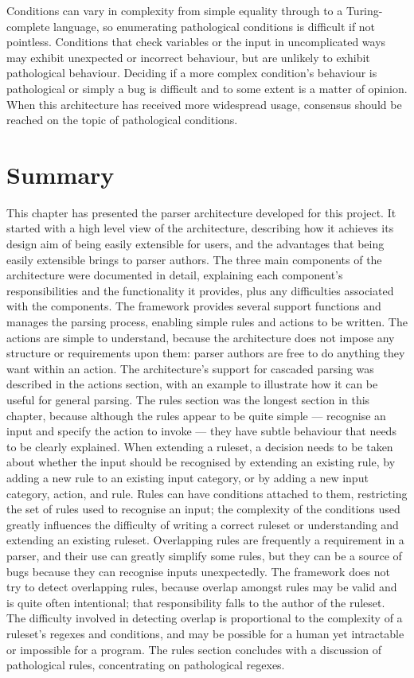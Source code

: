 Conditions can vary in complexity from simple equality through to a
Turing-complete language, so enumerating pathological conditions is
difficult if not pointless.  Conditions that check variables or the input
in uncomplicated ways may exhibit unexpected or incorrect behaviour, but
are unlikely to exhibit pathological behaviour.  Deciding if a more complex
condition's behaviour is pathological or simply a bug is difficult and to
some extent is a matter of opinion.  When this architecture has received
more widespread usage, consensus should be reached on the topic of
pathological conditions.

\section{Summary}

This chapter has presented the parser architecture developed for this
project.  It started with a high level view of the architecture, describing
how it achieves its design aim of being easily extensible for users, and
the advantages that being easily extensible brings to parser authors.  The
three main components of the architecture were documented in detail,
explaining each component's responsibilities and the functionality it
provides, plus any difficulties associated with the components.  The
framework provides several support functions and manages the parsing
process, enabling simple rules and actions to be written.  The actions are
simple to understand, because the architecture does not impose any
structure or requirements upon them: parser authors are free to do anything
they want within an action.  The architecture's support for cascaded
parsing was described in the actions section, with an example to illustrate
how it can be useful for general parsing.  The rules section was the
longest section in this chapter, because although the rules appear to be
quite simple --- recognise an input and specify the action to invoke ---
they have subtle behaviour that needs to be clearly explained.  When
extending a ruleset, a decision needs to be taken about whether the input
should be recognised by extending an existing rule, by adding a new rule to
an existing input category, or by adding a new input category, action, and
rule.  Rules can have conditions attached to them, restricting the set of
rules used to recognise an input; the complexity of the conditions used
greatly influences the difficulty of writing a correct ruleset or
understanding and extending an existing ruleset.  Overlapping rules are
frequently a requirement in a parser, and their use can greatly simplify
some rules, but they can be a source of bugs because they can recognise
inputs unexpectedly.  The framework does not try to detect overlapping
rules, because overlap amongst rules may be valid and is quite often
intentional; that responsibility falls to the author of the ruleset.  The
difficulty involved in detecting overlap is proportional to the complexity
of a ruleset's regexes and conditions, and may be possible for a human yet
intractable or impossible for a program.  The rules section concludes with
a discussion of pathological rules, concentrating on pathological regexes.
